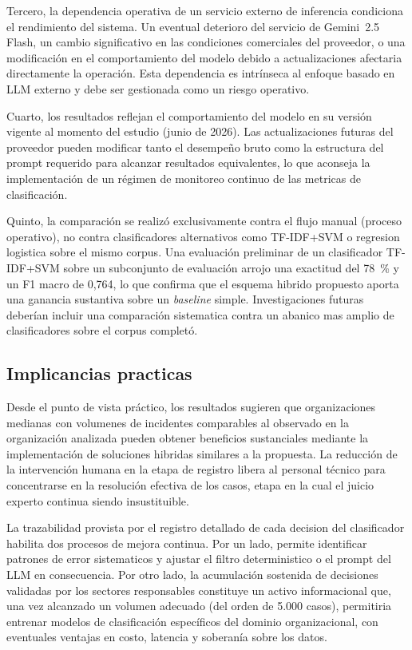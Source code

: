 Tercero, la dependencia operativa de un servicio externo de inferencia condiciona el rendimiento del sistema. Un eventual deterioro del servicio de Gemini~2.5 Flash, un cambio significativo en las condiciones comerciales del proveedor, o una modificación en el comportamiento del modelo debido a actualizaciones afectaria directamente la operación. Esta dependencia es intrínseca al enfoque basado en LLM externo y debe ser gestionada como un riesgo operativo.

Cuarto, los resultados reflejan el comportamiento del modelo en su versión vigente al momento del estudio (junio de 2026). Las actualizaciones futuras del proveedor pueden modificar tanto el desempeño bruto como la estructura del prompt requerido para alcanzar resultados equivalentes, lo que aconseja la implementación de un régimen de monitoreo continuo de las metricas de clasificación.

Quinto, la comparación se realizó exclusivamente contra el flujo manual (proceso operativo), no contra clasificadores alternativos como TF-IDF+SVM o regresion logistica sobre el mismo corpus. Una evaluación preliminar de un clasificador TF-IDF+SVM sobre un subconjunto de evaluación arrojo una exactitud del 78~\% y un F1 macro de 0,764, lo que confirma que el esquema hibrido propuesto aporta una ganancia sustantiva sobre un \emph{baseline} simple. Investigaciones futuras deberían incluir una comparación sistematica contra un abanico mas amplio de clasificadores sobre el corpus completó.

\subsection{Implicancias practicas}

Desde el punto de vista práctico, los resultados sugieren que organizaciones medianas con volumenes de incidentes comparables al observado en la organización analizada pueden obtener beneficios sustanciales mediante la implementación de soluciones hibridas similares a la propuesta. La reducción de la intervención humana en la etapa de registro libera al personal técnico para concentrarse en la resolución efectiva de los casos, etapa en la cual el juicio experto continua siendo insustituible.

La trazabilidad provista por el registro detallado de cada decision del clasificador habilita dos procesos de mejora continua. Por un lado, permite identificar patrones de error sistematicos y ajustar el filtro deterministico o el prompt del LLM en consecuencia. Por otro lado, la acumulación sostenida de decisiones validadas por los sectores responsables constituye un activo informacional que, una vez alcanzado un volumen adecuado (del orden de 5.000 casos), permitiria entrenar modelos de clasificación específicos del dominio organizacional, con eventuales ventajas en costo, latencia y soberanía sobre los datos.

